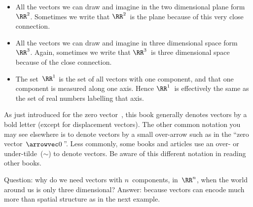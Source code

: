 \begin{example} \label{eg:}
\begin{itemize}
\item All the vectors we can draw and imagine in the two dimensional plane form~\(\RR^2\).  
Sometimes we write that \(\RR^2\)~is the plane because of this very close connection.

\item All the vectors we can draw and imagine in three dimensional space form~\(\RR^3\).  
Again, sometimes we write that \(\RR^3\)~is three dimensional space because of the close connection. 

\item The set~\(\RR^1\) is the set of all vectors with one component, and that one component is measured along one axis.  
Hence \(\RR^1\)~is effectively the same as the set of real numbers labelling that axis.
\end{itemize}
\end{example}


As just introduced for the zero vector~\ov, this book generally denotes vectors by a bold letter (except for displacement vectors).
The other common notation you may see elsewhere is to denote vectors by a small over-arrow such as in the ``zero vector~\(\arrowvec0\)\,''.
Less commonly, some books and articles use an over- or under-tilde~(\(\sim\)) to denote vectors.
Be aware of this different notation in reading other books.



Question: why do we need vectors with \(n\)~components, in~\(\RR^n\), when the world around us is only three dimensional?
Answer: because vectors can encode much more than spatial structure as in the next example. 


